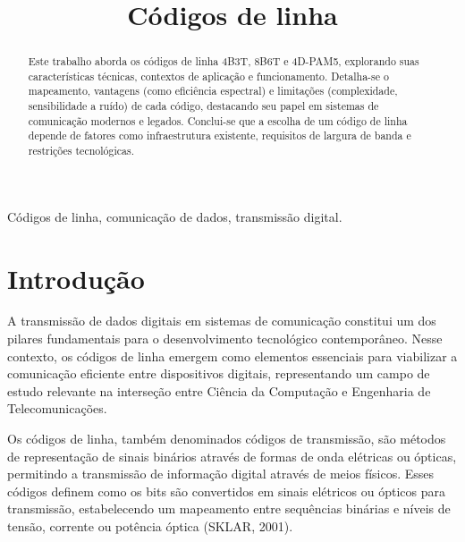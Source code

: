 \documentclass[conference]{IEEEtran}
\begin{document}
\title{Códigos de linha}

\author{
}

\maketitle


\begin{abstract}
Este trabalho aborda os códigos de linha 4B3T, 8B6T e 4D-PAM5, explorando suas características técnicas, contextos de aplicação e funcionamento. Detalha-se o mapeamento, vantagens (como eficiência espectral) e limitações (complexidade, sensibilidade a ruído) de cada código, destacando seu papel em sistemas de comunicação modernos e legados. Conclui-se que a escolha de um código de linha depende de fatores como infraestrutura existente, requisitos de largura de banda e restrições tecnológicas.
\end{abstract}

\begin{IEEEkeywords}
Códigos de linha, comunicação de dados, transmissão digital.
\end{IEEEkeywords}

\section{Introdução}

A transmissão de dados digitais em sistemas de comunicação constitui um dos pilares fundamentais para o desenvolvimento tecnológico contemporâneo. Nesse contexto, os códigos de linha emergem como elementos essenciais para viabilizar a comunicação eficiente entre dispositivos digitais, representando um campo de estudo relevante na interseção entre Ciência da Computação e Engenharia de Telecomunicações.

Os códigos de linha, também denominados códigos de transmissão, são métodos de representação de sinais binários através de formas de onda elétricas ou ópticas, permitindo a transmissão de informação digital através de meios físicos. Esses códigos definem como os bits são convertidos em sinais elétricos ou ópticos para transmissão, estabelecendo um mapeamento entre sequências binárias e níveis de tensão, corrente ou potência óptica (SKLAR, 2001).
\end{document}
